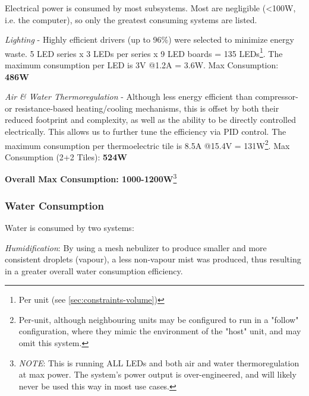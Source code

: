 \documentclass{report}
\begin{document}

Electrical power is consumed by most subsystems. Most are negligible (<100W, i.e. the computer), so only the greatest consuming systems are listed.

\textit{Lighting} - Highly efficient drivers (up to 96\%) were selected to minimize energy waste. 5 LED series x 3 LEDs per series x 9 LED boards = 135 LEDs\footnote{Per unit (see \ref{sec:constraints-volume})}. The maximum consumption per LED is 3V @1.2A = 3.6W. Max Consumption: \textbf{486W}\footnotemark[1]

\textit{Air \& Water Thermoregulation} - Although less energy efficient than compressor- or resistance-based heating/cooling mechanisms, this is offset by both their reduced footprint and complexity, as well as the ability to be directly controlled electrically. This allows us to further tune the efficiency via PID control. The maximum consumption per thermoelectric tile is 8.5A @15.4V = 131W\footnote{Per-unit, although neighbouring units may be configured to run in a "follow" configuration, where they mimic the environment of the "host" unit, and may omit this system.}. Max Consumption (2+2 Tiles\footnotemark[1]): \textbf{524W}

\textbf{Overall Max Consumption: 1000-1200W}\footnote{\textit{NOTE}: This is running ALL LEDs and both air and water thermoregulation at max power. The system's power output is over-engineered, and will likely never be used this way in most use cases.}
\newpage


\subsubsection{Water Consumption}
\label{sec:constraints-water}





Water is consumed by two systems:

\textit{Humidification}: By using a mesh nebulizer to produce smaller and more consistent droplets (vapour), a less non-vapour mist was produced, thus resulting in a greater overall water consumption efficiency.
\end{document}
